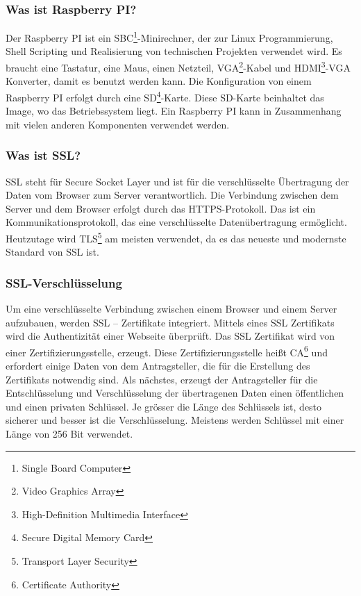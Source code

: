 \subsubsection{Was ist Raspberry PI?} 
Der Raspberry PI ist ein SBC\footnote{Single Board Computer}-Minirechner, der zur Linux Programmierung, Shell Scripting und Realisierung von technischen Projekten verwendet wird. Es braucht eine Tastatur, eine Maus, einen Netzteil, VGA\footnote{Video Graphics Array}-Kabel und HDMI\footnote{High-Definition Multimedia Interface}-VGA Konverter, damit es benutzt werden kann. Die Konfiguration von einem Raspberry PI erfolgt durch eine SD\footnote{Secure Digital Memory Card}-Karte. Diese SD-Karte beinhaltet das Image, wo das Betriebssystem liegt. Ein Raspberry PI kann in Zusammenhang mit vielen anderen Komponenten verwendet werden. \cite{50_raspi}
\subsubsection{Was ist SSL?} 
SSL steht für Secure Socket Layer und ist für die verschlüsselte Übertragung der Daten vom Browser zum Server verantwortlich. Die Verbindung zwischen dem Server und dem Browser erfolgt durch das HTTPS-Protokoll. Das ist ein Kommunikationsprotokoll, das eine verschlüsselte Datenübertragung ermöglicht. Heutzutage wird TLS\footnote{Transport Layer Security} am meisten verwendet, da es das neueste und modernste Standard von SSL ist. \cite{50_ssl}
\subsubsection{SSL-Verschlüsselung}
Um eine verschlüsselte Verbindung zwischen einem Browser und einem Server aufzubauen, werden SSL – Zertifikate integriert. Mittels eines SSL Zertifikats wird die Authentizität einer Webseite überprüft. Das SSL Zertifikat wird von einer Zertifizierungsstelle, erzeugt. Diese Zertifizierungsstelle heißt CA\footnote{Certificate Authority} und erfordert einige Daten von dem Antragsteller, die für die Erstellung des Zertifikats notwendig sind. Als nächstes, erzeugt der Antragsteller für die Entschlüsselung und Verschlüsselung der übertragenen Daten einen öffentlichen und einen privaten Schlüssel. Je grösser die Länge des Schlüssels ist, desto sicherer und besser ist die Verschlüsselung. Meistens werden Schlüssel mit einer Länge von 256 Bit verwendet. \cite{50_ssl}

